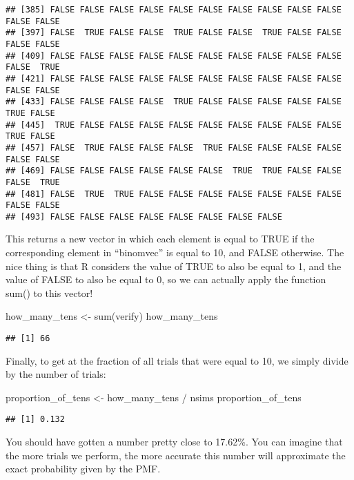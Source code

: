 \documentclass[
]{book}
\newenvironment{Shaded}{\begin{snugshade}}{\end{snugshade}}
\newcommand{\FunctionTok}[1]{\textcolor[rgb]{0.00,0.00,0.00}{#1}}
\newcommand{\NormalTok}[1]{#1}
\newcommand{\OtherTok}[1]{\textcolor[rgb]{0.56,0.35,0.01}{#1}}
\newcommand{\SpecialCharTok}[1]{\textcolor[rgb]{0.00,0.00,0.00}{#1}}
\begin{document}
\begin{verbatim}
## [385] FALSE FALSE FALSE FALSE FALSE FALSE FALSE FALSE FALSE FALSE FALSE FALSE
## [397] FALSE  TRUE FALSE FALSE  TRUE FALSE FALSE  TRUE FALSE FALSE FALSE FALSE
## [409] FALSE FALSE FALSE FALSE FALSE FALSE FALSE FALSE FALSE FALSE FALSE  TRUE
## [421] FALSE FALSE FALSE FALSE FALSE FALSE FALSE FALSE FALSE FALSE FALSE FALSE
## [433] FALSE FALSE FALSE FALSE  TRUE FALSE FALSE FALSE FALSE FALSE  TRUE FALSE
## [445]  TRUE FALSE FALSE FALSE FALSE FALSE FALSE FALSE FALSE FALSE  TRUE FALSE
## [457] FALSE  TRUE FALSE FALSE FALSE  TRUE FALSE FALSE FALSE FALSE FALSE FALSE
## [469] FALSE FALSE FALSE FALSE FALSE FALSE  TRUE  TRUE FALSE FALSE FALSE  TRUE
## [481] FALSE  TRUE  TRUE FALSE FALSE FALSE FALSE FALSE FALSE FALSE FALSE FALSE
## [493] FALSE FALSE FALSE FALSE FALSE FALSE FALSE FALSE
\end{verbatim}

This returns a new vector in which each element is equal to TRUE if the corresponding element in ``binomvec'' is equal to 10, and FALSE otherwise. The nice thing is that R considers the value of TRUE to also be equal to 1, and the value of FALSE to also be equal to 0, so we can actually apply the function sum() to this vector!

\begin{Shaded}
\begin{Highlighting}[]
\NormalTok{how\_many\_tens }\OtherTok{\textless{}{-}} \FunctionTok{sum}\NormalTok{(verify)}
\NormalTok{how\_many\_tens}
\end{Highlighting}
\end{Shaded}

\begin{verbatim}
## [1] 66
\end{verbatim}

Finally, to get at the fraction of all trials that were equal to 10, we simply divide by the number of trials:

\begin{Shaded}
\begin{Highlighting}[]
\NormalTok{proportion\_of\_tens }\OtherTok{\textless{}{-}}\NormalTok{ how\_many\_tens }\SpecialCharTok{/}\NormalTok{ nsims}
\NormalTok{proportion\_of\_tens}
\end{Highlighting}
\end{Shaded}

\begin{verbatim}
## [1] 0.132
\end{verbatim}

You should have gotten a number pretty close to 17.62\%. You can imagine that the more trials we perform, the more accurate this number will approximate the exact probability given by the PMF.
\end{document}
